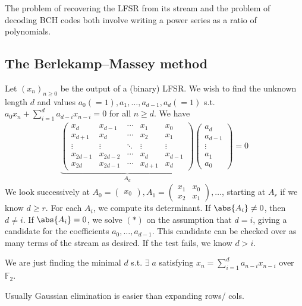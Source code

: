 \begin{remark}
    The problem of recovering the LFSR from its stream and the problem of decoding BCH codes both involve writing a power series as a ratio of polynomials.
\end{remark}

\subsection{The Berlekamp--Massey method}
Let $(x_n)_{n \geq 0}$ be the output of a (binary) LFSR.
We wish to find the unknown length $d$ and values $a_0 (=1), a_1, \dots, a_{d-1}, a_d(=1)$ s.t. $a_0 x_n + \sum_{i=1}^d a_{d-i} x_{n-i} = 0$ for all $n \geq d$.
We have
\begin{align*}
    \underbrace{\begin{pmatrix}
        x_d & x_{d-1} & \cdots & x_1 & x_0 \\
        x_{d+1} & x_d & \cdots & x_2 & x_1 \\
        \vdots & \vdots & \ddots & \vdots & \vdots \\
        x_{2d-1} & x_{2d-2} & \cdots & x_d & x_{d-1} \\
        x_{2d} & x_{2d-1} & \cdots & x_{d+1} & x_d
    \end{pmatrix}}_{A_d} \begin{pmatrix}
        a_d \\
        a_{d-1} \\
        \vdots \\
        a_1 \\
        a_0
    \end{pmatrix} = 0 \tag{$\ast$}
\end{align*}
We look successively at $A_0 = \begin{pmatrix}
    x_0
\end{pmatrix}, A_1 = \begin{pmatrix}
    x_1 & x_0 \\
    x_2 & x_1
\end{pmatrix}, \dots$, starting at $A_r$ if we know $d \geq r$.
For each $A_i$, we compute its determinant.
If $\abs{A_i} \neq 0$, then $d \neq i$.
If $\abs{A_i} = 0$, we solve $(\ast)$ on the assumption that $d = i$, giving a candidate for the coefficients $a_0, \dots, a_{d-1}$.
This candidate can be checked over as many terms of the stream as desired.
If the test fails, we know $d > i$.

\begin{remark}
    We are just finding the minimal $d$ s.t. $\exists \; a$ satisfying $x_n = \sum_{i=1}^d {a_{n-i} x_{n - i}}$ over $\mathbb{F}_2$.
\end{remark}

\begin{remark}
    Usually Gaussian elimination is easier than expanding rows/ cols.
\end{remark}
